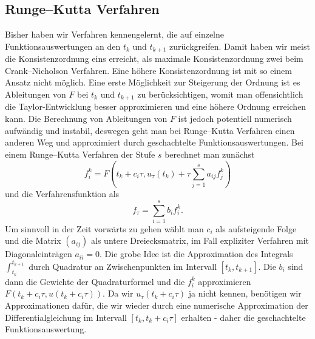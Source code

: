 \subsection{Runge--Kutta Verfahren}

Bisher haben wir Verfahren kennengelernt, die auf einzelne Funktionsauswertungen an den $t_k$ und $t_{k+1}$ zurückgreifen. Damit haben wir meist die Konsistenzordnung eins erreicht, als maximale Konsistenzordnung zwei beim Crank--Nicholson Verfahren. Eine höhere Konsistenzordnung ist mit so einem Ansatz nicht möglich. Eine erste Möglichkeit zur Steigerung der Ordnung ist es Ableitungen von $F$ bei $t_k$ und $t_{k+1}$ zu berücksichtigen, womit man offensichtlich die Taylor-Entwicklung besser approximieren und eine höhere Ordnung erreichen kann. Die Berechnung von Ableitungen von $F$ ist jedoch potentiell numerisch aufwändig und instabil, deswegen geht man bei Runge--Kutta Verfahren einen anderen Weg und approximiert durch geschachtelte Funktionsauswertungen. Bei einem Runge--Kutta Verfahren der Stufe $s$ berechnet man zunächst
$$ f_i^k =  F(t_k + c_i \tau, u_\tau(t_k) + \tau \sum_{j=1}^s a_{ij} f_j^k) $$ 
und die Verfahrensfunktion als 
$$ f_\tau = \sum_{i=1}^s b_i f_i^k. $$
Um sinnvoll in der Zeit vorwärts zu gehen wählt man $c_i$ als aufsteigende Folge und die Matrix $(a_{ij})$ als untere Dreiecksmatrix, im Fall expliziter Verfahren mit Diagonaleinträgen $a_{ii}=0$. Die grobe Idee ist die Approximation des Integrals $\int_{t_k}^{t_{k+1}}$ durch Quadratur an Zwischenpunkten im Intervall $[t_k,t_{k+1}]$. Die $b_i$ sind dann die Gewichte der Quadraturformel und die $f_i^k$ approximieren $F(t_k+c_i\tau,u(t_k + c_i\tau))$. Da wir $u_\tau(t_k+c_i \tau)$ ja nicht kennen, benötigen wir Approximationen dafür, die wir wieder durch eine numerische Approximation der Differentialgleichung im Intervall $[t_k,t_k+c_i\tau]$ erhalten - daher die geschachtelte Funktionsauswertung.

